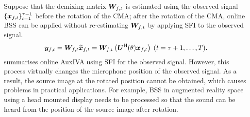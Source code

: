 \documentclass[sip,biber]{now-journal}
\begin{document}
Suppose that the demixing matrix $\Demix _{\ft}$ is estimated using the observed signal $\{\Obs _{\ft}\} _{\tframe = 1} ^{\rotFra - 1}$ before the rotation of the CMA;
after the rotation of the CMA, online BSS can be applied without re-estimating $\Demix _{\ft}$ by applying SFI to the observed signal.
\begin{equation}
  \Est _{\ft} = \Demix _{\ft} \refpos{\Obs} _{\ft} = \Demix _{\ft} \left(\rotMat ^{\hermite} (\rotSpat) \Obs _{\ft}\right)\; (\tframe = \rotFra + 1, \dots, \Tframe).
\end{equation}
 summarises online AuxIVA using SFI for the observed signal.
However, this process virtually changes the microphone position of the observed signal.
As a result, the source image at the rotated position cannot be obtained, which causes problems in practical applications.
For example, BSS in augmented reality space using a head mounted display needs to be processed so that the sound can be heard from the position of the source image after rotation.
\end{document}
